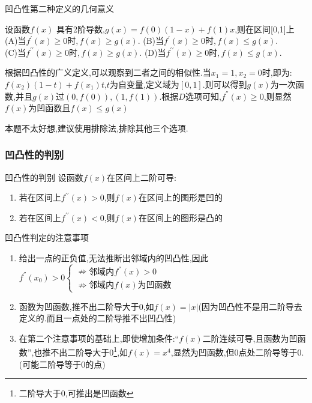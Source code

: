 \documentclass[8pt a4paper, oneside, UTF8]{ctexbook}  %
\begin{document}
\begin{sloppypar}
\begin{criterion}{凹凸性第二种定义的几何意义}{}
\begin{center}
\begin{tikzpicture}[x=0.75pt,y=0.75pt,yscale=-1,xscale=1]
            \end{tikzpicture}
        \end{center}
    \end{criterion}
    \begin{problem}
    设函数$f(x)$ 具有2阶导数,$g(x)=f(0)(1-x)+f(1)x$,则在区间[0,1]上\\
    (A)当$f^\prime(x)\geqslant0$时$,f(x)\geq g(x).$ \quad (B)当$f^\prime(x)\geqslant0$时$,f(x)\leq g(x).$\\
    (C)当$f^{\prime\prime}(x)\geqslant0$时$,f(x)\geqslant g(x).$ \quad (D)当$f^{\prime\prime}(x)\geqslant0$时$,f(x)\leq g(x).$
    \end{problem}
    \begin{solution}
        根据凹凸性的广义定义,可以观察到二者之间的相似性.当$x_1=1,x_2=0$时,即为:$f(x_2)(1-t)+f(x_1)t$,$t$为自变量,定义域为$[0,1]$.则可以得到$g(x)$为一次函数,并且$g(x)$过$(0,f(0)),(1,f(1))$.根据$D$选项可知,$f^{''}(x)\geqslant0$,则显然$f(x)$为凹函数且$f(x)\leqslant g(x)$
    \end{solution}
    \begin{note}
        本题不太好想,建议使用排除法,排除其他三个选项.
    \end{note}
    \subsubsection{凹凸性的判别}
    \begin{defn}{凹凸性的判别}{}
        设函数$f(x)$在区间上二阶可导:
        \begin{enumerate}
            \item 若在区间上$f^{\prime\prime}(x)>0$,则$f(x)$在区间上的图形是凹的
            \item 若在区间上$f^{\prime\prime}(x)<$0,则$f(x)$在区间上的图形是凸的
        \end{enumerate}
    \end{defn}
    \begin{criterion}{凹凸性判定的注意事项}{}
        \begin{enumerate}
            \item 给出一点的正负值,无法推断出邻域内的凹凸性,因此$f^{''}(x_0)>0\begin{cases}
                          \nRightarrow \text{邻域内}f^{''}(x)>0 \\
                          \nRightarrow \text{邻域内}f(x)\text{为凹函数}
                      \end{cases}$
            \item 函数为凹函数,推不出二阶导大于0,如$f(x)=|x|$(因为凹凸性不是用二阶导去定义的.而且一点处的二阶导推不出凹凸性)
            \item 在第二个注意事项的基础上,即使增加条件:“$f(x)$二阶连续可导,且函数为凹函数”,也推不出二阶导大于0\footnote{二阶导大于0,可推出是凹函数},如$f(x)=x^4$,显然为凹函数,但0点处二阶导等于0.(可能二阶导等于0的点)
        \end{enumerate}
    \end{criterion}

\end{sloppypar}
\end{document}
